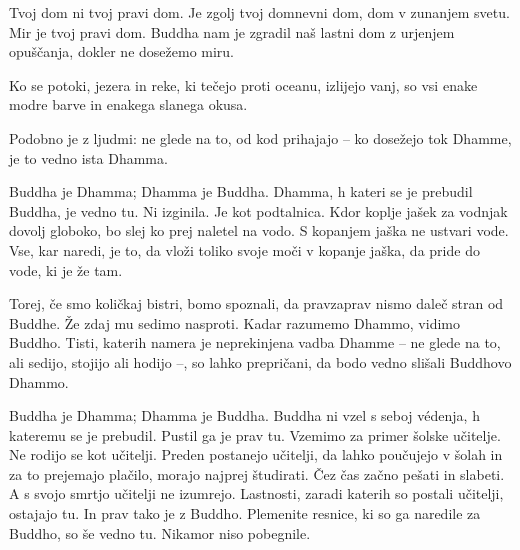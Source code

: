 
\cleartorecto
\thispagestyle{empty}

\vspace*{-\headsep}
\noindent%
\begin{minipage}[c][\textheight][c]{\linewidth}

\noindent%
\begin{minipage}{\linewidth}
\raggedright


Tvoj dom ni tvoj pravi dom. Je zgolj tvoj domnevni dom, dom v zunanjem svetu. Mir je tvoj pravi dom. Buddha nam je zgradil naš lastni dom z urjenjem opuščanja, dokler ne dosežemo miru.

\end{minipage}

\end{minipage}


\clearpage


Ko se potoki, jezera in reke, ki tečejo proti oceanu, izlijejo vanj, so vsi enake modre barve in enakega slanega okusa.

Podobno je z ljudmi: ne glede na to, od kod prihajajo – ko dosežejo tok Dhamme, je to vedno ista Dhamma.


Buddha je Dhamma; Dhamma je Buddha. Dhamma, h kateri se je prebudil Buddha, je vedno tu. Ni izginila. Je kot podtalnica. Kdor koplje jašek za vodnjak dovolj globoko, bo slej ko prej naletel na vodo. S kopanjem jaška ne ustvari vode. Vse, kar naredi, je to, da vloži toliko svoje moči v kopanje jaška, da pride do vode, ki je že tam.

Torej, če smo količkaj bistri, bomo spoznali, da pravzaprav nismo daleč stran od Buddhe. Že zdaj mu sedimo nasproti. Kadar razumemo Dhammo, vidimo Buddho. Tisti, katerih namera je neprekinjena vadba Dhamme – ne glede na to, ali sedijo, stojijo ali hodijo –, so lahko prepričani, da bodo vedno slišali Buddhovo Dhammo.

\clearpage


Buddha je Dhamma; Dhamma je Buddha. Buddha ni vzel s seboj védenja, h kateremu se je prebudil. Pustil ga je prav tu. Vzemimo za primer šolske učitelje. Ne rodijo se kot učitelji. Preden postanejo učitelji, da lahko poučujejo v šolah in za to prejemajo plačilo, morajo najprej študirati. Čez čas začno pešati in slabeti. A s svojo smrtjo učitelji ne izumrejo. Lastnosti, zaradi katerih so postali učitelji, ostajajo tu. In prav tako je z Buddho. Plemenite resnice, ki so ga naredile za Buddho, so še vedno tu. Nikamor niso pobegnile.

